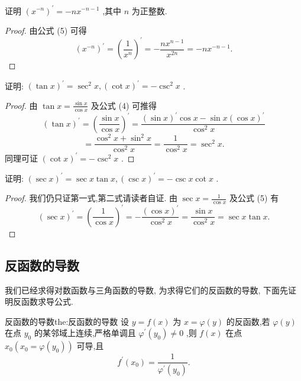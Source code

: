 \begin{example}
证明 \({\left( {x}^{-n}\right) }^{\prime } =  - n{x}^{-n - 1}\) ,其中 \(n\) 为正整数.
\end{example}


\begin{proof}
由公式 (5) 可得
\[
{\left( {x}^{-n}\right) }^{\prime } = {\left( \frac{1}{{x}^{n}}\right) }^{\prime } =  - \frac{n{x}^{n - 1}}{{x}^{2n}} =  - n{x}^{-n - 1}.
\]
\end{proof}

\begin{example}
证明: \({\left( \tan x\right) }^{\prime } = {\sec }^{2}x,{\left( \cot x\right) }^{\prime } =  - {\csc }^{2}x\) .

\end{example}

\begin{proof}
由 \(\tan x = \frac{\sin x}{\cos x}\) 及公式 (4) 可推得
\[
{\left( \tan x\right) }^{\prime } = {\left( \frac{\sin x}{\cos x}\right) }^{\prime } = \frac{{\left( \sin x\right) }^{\prime }\cos x - \sin x{\left( \cos x\right) }^{\prime }}{{\cos }^{2}x}
\]
\[
= \frac{{\cos }^{2}x + {\sin }^{2}x}{{\cos }^{2}x} = \frac{1}{{\cos }^{2}x} = {\sec }^{2}x.
\]
同理可证 \({\left( \cot x\right) }^{\prime } =  - {\csc }^{2}x\) .
\end{proof}


\begin{example}
证明: \({\left( \sec x\right) }^{\prime } = \sec x\tan x,{\left( \csc x\right) }^{\prime } =  - \csc x\cot x\) .
\end{example}

\begin{proof}
我们仍只证第一式,第二式请读者自证. 由 \(\sec x = \frac{1}{\cos x}\) 及公式 (5) 有
\[
{\left( \sec x\right) }^{\prime } = {\left( \frac{1}{\cos x}\right) }^{\prime } =  - \frac{{\left( \cos x\right) }^{\prime }}{{\cos }^{2}x} = \frac{\sin x}{{\cos }^{2}x} = \sec x\tan x.
\]
\end{proof}

\subsection{反函数的导数}

我们已经求得对数函数与三角函数的导数, 为求得它们的反函数的导数, 下面先证明反函数求导公式.

\begin{theorem}{反函数的导数}{the:反函数的导数}
设 \(y = f\left( x\right)\) 为 \(x = \varphi \left( y\right)\) 的反函数,若 \(\varphi \left( y\right)\) 在点 \({y}_{0}\) 的某邻域上连续,严格单调且 \({\varphi }^{\prime }\left( {y}_{0}\right)  \neq  0\) ,则 \(f\left( x\right)\) 在点 \({x}_{0}\left( {{x}_{0} = \varphi \left( {y}_{0}\right) }\right)\) 可导,且
\[
{f}^{\prime }\left( {x}_{0}\right)  = \frac{1}{{\varphi }^{\prime }\left( {y}_{0}\right) }. \tag{6}
\]
\end{theorem}

